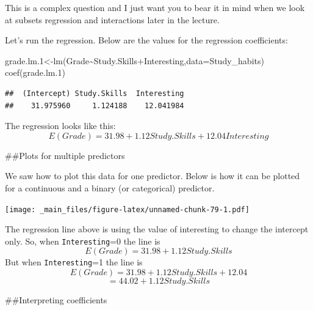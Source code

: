 \documentclass[
]{gitbook}
\newenvironment{Shaded}{\begin{snugshade}}{\end{snugshade}}
\newcommand{\AttributeTok}[1]{\textcolor[rgb]{0.77,0.63,0.00}{#1}}
\newcommand{\FloatTok}[1]{\textcolor[rgb]{0.00,0.00,0.81}{#1}}
\newcommand{\FunctionTok}[1]{\textcolor[rgb]{0.00,0.00,0.00}{#1}}
\newcommand{\NormalTok}[1]{#1}
\newcommand{\OtherTok}[1]{\textcolor[rgb]{0.56,0.35,0.01}{#1}}
\newcommand{\SpecialCharTok}[1]{\textcolor[rgb]{0.00,0.00,0.00}{#1}}
\begin{document}
This is a complex question and I just want you to bear it in mind when we look at subsets regression and interactions later in the lecture.

Let's run the regression. Below are the values for the regression coefficients:

\begin{Shaded}
\begin{Highlighting}[]
\NormalTok{grade.lm}\FloatTok{.1}\OtherTok{\textless{}{-}}\FunctionTok{lm}\NormalTok{(Grade}\SpecialCharTok{\textasciitilde{}}\NormalTok{Study.Skills}\SpecialCharTok{+}\NormalTok{Interesting,}\AttributeTok{data=}\NormalTok{Study\_habits)}
\FunctionTok{coef}\NormalTok{(grade.lm}\FloatTok{.1}\NormalTok{)}
\end{Highlighting}
\end{Shaded}

\begin{verbatim}
##  (Intercept) Study.Skills  Interesting 
##    31.975960     1.124188    12.041984
\end{verbatim}

The regression looks like this:
\[ E(Grade) =31.98 + 1.12 Study.Skills + 12.04 Interesting \]

\#\#Plots for multiple predictors

We saw how to plot this data for one predictor. Below is how it can be plotted for a continuous and a binary (or categorical) predictor.

\texttt{[image: \_main\_files/figure-latex/unnamed-chunk-79-1.pdf]}


The regression line above is using the value of interesting to change the intercept only.
So, when \texttt{Interesting}=0 the line is
\[ E(Grade) =31.98 + 1.12 Study.Skills\]
But when \texttt{Interesting}=1 the line is
\[ E(Grade)  =31.98 + 1.12 Study.Skills + 12.04\]
\[ = 44.02 + 1.12 Study.Skills\]

\#\#Interpreting coefficients
\end{document}
